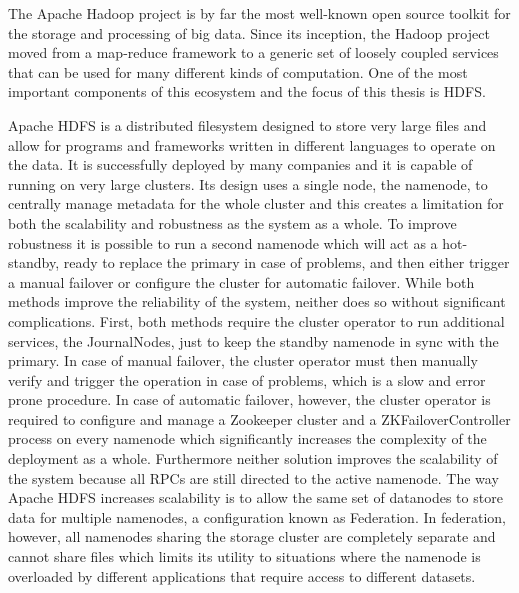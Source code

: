 The Apache Hadoop project is by far the most well-known open source toolkit for the storage and processing of big data.
Since its inception, the Hadoop project moved from a map-reduce framework to a generic set of loosely coupled services that can be used for many different kinds of computation.
One of the most important components of this ecosystem and the focus of this thesis is HDFS.

Apache HDFS \cite{DBLP:conf/mss/ShvachkoKRC10} is a distributed filesystem designed to store very large files and allow for programs and frameworks written in different languages to operate on the data.
It is successfully deployed by many companies and it is capable of running on very large clusters.
Its design uses a single node, the namenode, to centrally manage metadata for the whole cluster and this creates a limitation for both the scalability and robustness as the system as a whole.
To improve robustness it is possible to run a second namenode which will act as a hot-standby, ready to replace the primary in case of problems, and then either trigger a manual failover or configure the cluster for automatic failover.
While both methods improve the reliability of the system, neither does so without significant complications.
First, both methods require the cluster operator to run additional services, the JournalNodes, just to keep the standby namenode in sync with the primary.
In case of manual failover, the cluster operator must then manually verify and trigger the operation in case of problems, which is a slow and error prone procedure.
In case of automatic failover, however, the cluster operator is required to configure and manage a Zookeeper cluster and a ZKFailoverController process on every namenode which significantly increases the complexity of the deployment as a whole.
Furthermore neither solution improves the scalability of the system because all RPCs are still directed to the active namenode.
The way Apache HDFS increases scalability is to allow the same set of datanodes to store data for multiple namenodes, a configuration known as Federation.
In federation, however, all namenodes sharing the storage cluster are completely separate and cannot share files which limits its utility to situations where the namenode is overloaded by different applications that require access to different datasets.

